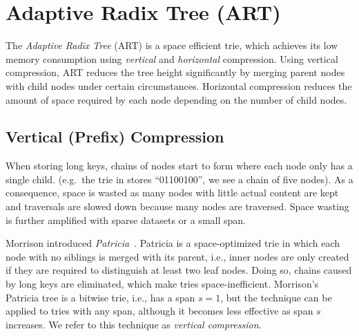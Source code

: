 \documentclass[abstracton,12pt]{scrartcl}
\theoremstyle{definition}
\begin{document}
\newpage

\section{Adaptive Radix Tree (ART)}\label{sec:art}

The \textit{Adaptive Radix Tree} (ART) is a space efficient trie, which
achieves its low memory consumption using \textit{vertical} and 
\textit{horizontal} compression. Using vertical compression, ART reduces
the tree height significantly by merging parent nodes with child nodes
under certain circumstances. Horizontal compression reduces the amount
of space required by each node depending on the number of child nodes.

\subsection{Vertical (Prefix) Compression}\label{sec:vertical-compression}

When storing long keys, chains of nodes start to form where each node only
has a single child. (e.g.\ the trie in  stores ``01100100'',
we see a chain of five nodes).
As a consequence, space is wasted as many nodes
with little actual content are kept and traversals are slowed down because
many nodes are traversed. Space wasting is further amplified with sparse
datasets or a small span.

Morrison introduced \textit{Patricia}~\cite{morrison1968patricia}. 
Patricia is a space-optimized trie in which
each node with no siblings is merged with its parent, i.e., inner nodes
are only created if they are required to distinguish at least two leaf nodes. 
Doing so, chains caused by long keys are eliminated, which make tries 
space-inefficient. Morrison's Patricia tree is a bitwise trie, i.e.,
has a span $s=1$, but the technique can be applied to tries with any span,
although it becomes less effective as span $s$ increases.
We refer to this technique as \textit{vertical compression}.
\end{document}
